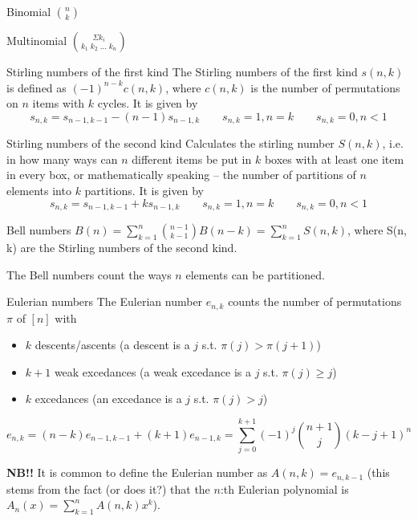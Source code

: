 

\begin{algorithm}{Binomial $\binom{n}{k}$}
\end{algorithm}

\begin{algorithm}{Multinomial $\binom{\Sigma k_i}{k_1\;k_2\;\ldots\;k_n}$}
\end{algorithm}

\begin{algorithm}{Stirling numbers of the first kind}
\desc
The Stirling numbers of the first kind $s(n,k)$ is defined as
$(-1)^{n-k}c(n,k)$, where $c(n,k)$ is the number of permutations on
$n$ items with $k$ cycles. It is given by
$$s_{n,k} = s_{n-1,k-1} - (n-1)s_{n-1,k} \qquad s_{n,k} = 1, n = k \qquad s_{n,k} = 0, n < 1$$
\end{algorithm}

\begin{algorithm}{Stirling numbers of the second kind}
\desc
Calculates the stirling number $S(n,k)$, i.e. in how many ways can $n$
different items be put in $k$ boxes with at least one item in every
box, or mathematically speaking -- the number of partitions of $n$
elements into $k$ partitions. It is given by
$$s_{n,k} = s_{n-1,k-1} + ks_{n-1,k} \qquad s_{n,k} = 1, n = k \qquad s_{n,k} = 0, n < 1$$
\end{algorithm}

\begin{algorithm}{Bell numbers}
\desc
$B(n) = \sum_{k=1}^n \binom{n-1}{k-1} B(n-k) = \sum_{k=1}^n S(n,k)$,
where S(n, k) are the Stirling numbers of the second kind.

The Bell numbers count the ways $n$ elements can be partitioned.
\end{algorithm}

\begin{algorithm}{Eulerian numbers}
\desc
The Eulerian number $e_{n,k}$ counts the number of permutations $\pi$
of $[n]$ with
\begin{itemize}
\item $k$ descents/ascents (a descent is a $j$ s.t. $\pi(j) > \pi(j+1)$)
\item $k+1$ weak excedances (a weak excedance is a $j$ s.t. $\pi(j) \ge j$)
\item $k$ excedances (an excedance is a $j$ s.t. $\pi(j) > j$)
\end{itemize}
$$e_{n,k} = (n-k)e_{n-1,k-1} + (k+1) e_{n-1, k} = \sum_{j=0}^{k+1}
(-1)^j \binom{n+1}{j} (k - j + 1)^n$$

{\bf NB!!} It is common to define the Eulerian number as $A(n,k) =
e_{n,k-1}$ (this stems from the fact (or does it?) that the $n$:th
Eulerian polynomial is $A_n(x) = \sum_{k=1}^{n} A(n,k)x^k$).
\end{algorithm}

